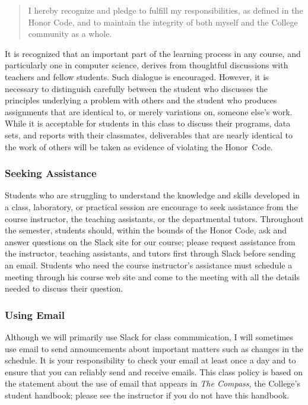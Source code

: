 \vspace*{-.11in}
\begin{quote}
  I hereby recognize and pledge to fulfill my responsibilities, as defined in the Honor Code, and to maintain the
  integrity of both myself and the College community as a whole.
\end{quote}
\vspace*{-.11in}

\noindent It is recognized that an important part of the learning process in any course, and particularly one in
computer science, derives from thoughtful discussions with teachers and fellow students.  Such dialogue is encouraged.
However, it is necessary to distinguish carefully between the student who discusses the principles underlying a problem
with others and the student who produces assignments that are identical to, or merely variations on, someone else's
work.  While it is acceptable for students in this class to discuss their programs, data sets, and reports with their
classmates, deliverables that are nearly identical to the work of others will be taken as evidence of violating the
\mbox{Honor Code}.

\subsubsection*{Seeking Assistance}

Students who are struggling to understand the knowledge and skills developed in a class, laboratory, or practical
session are encourage to seek assistance from the course instructor, the teaching assistants, or the departmental
tutors. Throughout the semester, students should, within the bounds of the Honor Code, ask and answer questions on the
Slack site for our course; please request assistance from the instructor, teaching assistants, and tutors first through
Slack before sending an email. Students who need the course instructor's assistance must schedule a meeting through his
course web site and come to the meeting with all the details needed to discuss their question.

\subsubsection*{Using Email}

Although we will primarily use Slack for class communication, I will sometimes use email to send announcements about
important matters such as changes in the schedule. It is your responsibility to check your email at least once a day and to
ensure that you can reliably send and receive emails. This class policy is based on the statement about the use of email that
appears in {\em The Compass}, the College's student handbook; please see the instructor if you do not have this
handbook.

